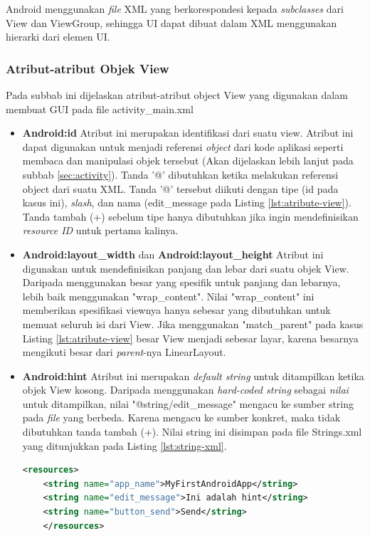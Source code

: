 Android menggunakan \textit{file} XML yang berkorespondesi kepada \textit{subclasses} dari View dan ViewGroup, sehingga UI dapat dibuat dalam XML menggunakan hierarki dari elemen UI.

\subsubsection{Atribut-atribut Objek View}
\label{sssec:atribut_atribut_objek_view}
Pada subbab ini dijelaskan atribut-atribut object View yang digunakan dalam membuat GUI pada file activity\_main.xml
\begin{itemize}
	\item \textbf{Android:id}
	Atribut ini merupakan identifikasi dari suatu view. Atribut ini dapat digunakan untuk menjadi referensi \textit{object} dari kode aplikasi seperti membaca dan manipulasi objek tersebut (Akan dijelaskan lebih lanjut pada subbab \ref{sec:activity}). Tanda '@' dibutuhkan ketika melakukan referensi object dari suatu XML. Tanda '@' tersebut diikuti dengan tipe (id pada kasus ini), \textit{slash}, dan nama (edit\_message pada Listing \ref{lst:atribute-view}). Tanda tambah (+) sebelum tipe hanya dibutuhkan jika ingin mendefinisikan \textit{resource ID} untuk pertama kalinya.
	\item \textbf{Android:layout\_width} dan \textbf{Android:layout\_height}
	Atribut ini digunakan untuk mendefinisikan panjang dan lebar dari suatu objek View. Daripada menggunakan besar yang spesifik untuk panjang dan lebarnya, lebih baik menggunakan "wrap\_content". Nilai "wrap\_content" ini memberikan spesifikasi viewnya hanya sebesar yang dibutuhkan untuk memuat seluruh isi dari View. Jika menggunakan "match\_parent" pada kasus Listing \ref{lst:atribute-view} besar View menjadi sebesar layar, karena besarnya mengikuti besar dari \textit{parent}-nya LinearLayout.

	\item \textbf{Android:hint}
	Atribut ini merupakan \textit{default string} untuk ditampilkan ketika objek View kosong. Daripada menggunakan \textit{hard-coded string} sebagai \textit{nilai} untuk ditampilkan, nilai "@string/edit\_message" mengacu ke sumber string pada \textit{file} yang berbeda. Karena mengacu ke sumber konkret, maka tidak dibutuhkan tanda tambah (+). Nilai string ini disimpan pada file Strings.xml yang ditunjukkan pada Listing \ref{lst:string-xml}.
	\begin{lstlisting}[caption={Contoh kode pada string.xml},label={lst:string-xml},language=xml]
	<resources>
    <string name="app_name">MyFirstAndroidApp</string>
    <string name="edit_message">Ini adalah hint</string>
    <string name="button_send">Send</string>
	</resources>


\end{lstlisting}
\end{itemize}
